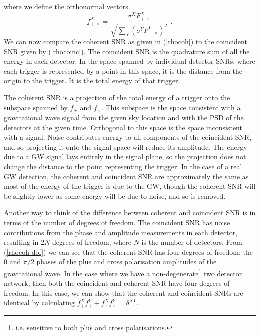 \documentclass[11pt]{cuthesis}
\begin{document}
where we define the orthonormal vectors
\begin{equation}
f^X_{+,\times} = \frac{\sigma^X F^X_{+,\times}}{\sqrt{\sum_Y( \sigma^Y F^Y_{+,\times})^2}} \textbf{ .}
\end{equation}
We can now compare the coherent SNR as given in (\ref{rhocoh}) to the coincident SNR given by (\ref{rhocoinc}). The coincident SNR is the quadrature sum of all the energy in each detector. In the space spanned by individual detector SNRs, where each trigger is represented by a point in this space, it is the distance from the origin to the trigger. It is the total energy of that trigger. 

The coherent SNR is a projection of the total energy of a trigger onto the subspace spanned by $f_+$ and $f_\times$. This subspace is the space consistent with a gravitational wave signal from the given sky location and with the PSD of the detectors at the given time. Orthogonal to this space is the space inconsistent with a signal. Noise contributes energy to all components of the coincident SNR, and so projecting it onto the signal space will reduce its amplitude. The energy due to a GW signal lays entirely in the signal plane, so the projection does not change the distance to the point representing the trigger. In the case of a real GW detection, the coherent and coincident SNR are approximately the same as most of the energy of the trigger is due to the GW, though the coherent SNR will be slightly lower as some energy will be due to noise, and so is removed. 

Another way to think of the difference between coherent and coincident SNR is in terms of the number of degrees of freedom. The coincident SNR has noise contributions from the phase and amplitude measurements in each detector, resulting in $2N$ degrees of freedom, where $N$ is the number of detectors. From (\ref{rhocoh dof}) we can see that the coherent SNR has four degrees of freedom: the $0$ and $\pi/2$ phases of the plus and cross polarisation amplitudes of the gravitational wave. In the case where we have a non-degenerate\footnote{i.e. sensitive to both plus and cross polarisations.} two detector network, then both the coincident and coherent SNR have four degrees of freedom. In this case, we can show that the coherent and coincident SNRs are identical by calculating $f^X_{+}f^Y_{+}+f^X_{\times}f^Y_{\times}=\delta^{XY}$.
\end{document}
